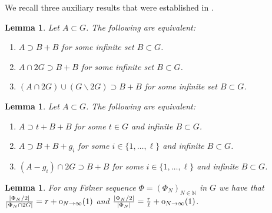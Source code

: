 \documentclass[reqno]{amsart}
\def\N{{\mathbb N}}
\newtheorem{lemma}[theorem]{Lemma}
\theoremstyle{definition}
\theoremstyle{remark}
\theoremstyle{remark}
\def\N{{\mathbb N}}
\newcommand{\Folner}{F\o{}lner}
\newcommand{\oh}{{\rm o}}
\begin{document}
We recall three auxiliary results that were established in \cite{charamaras_kousek_mountakis_radic2025BBingroups}. 

\begin{lemma} \label{lemma reductions no shift}
        Let $A \subset G$. The following are equivalent:
    \begin{enumerate}
        \item \label{lemma reductions no shift_1} $A\supset B+B$ for some 
        infinite set $B\subset G$.
        \item \label{lemma reductions no shift_2} $A \cap 2G \supset B+B$ for some infinite set $B\subset G$.
        \item \label{lemma reductions no shift_3} $(A \cap 2G) \cup(G \backslash 2G) \supset B+B$ for some infinite set $B\subset G$.
    \end{enumerate}
\end{lemma}

\begin{lemma} \label{lemma reductions with shift}
Let $A \subset G$. The following are equivalent:
\begin{enumerate}
    \item \label{lemma reductions with shift_1} $A\supset t+B+B$ for some $t \in G$ and infinite $B \subset G$.
    \item \label{lemma reductions with shift_2} $A \supset B+B + g_i$ for some $i \in \{1, \ldots, \ell\}$ and infinite 
    $B \subset G$.
    \item \label{lemma reductions with shift_3} $(A - g_i) \cap 2G  \supset B+B$ for some $i \in \{1, \ldots, \ell\}$ and infinite 
    $B \subset G$.
\end{enumerate}
\end{lemma}

\begin{lemma}\label{lemma aux folner 2}
For any \Folner{} sequence $\Phi=(\Phi_N)_{N\in \N}$ in $G$ we have that 
$\frac{|\Phi_N/2|}{|\Phi_N \cap 2G|}= r + \oh_{N\to \infty} (1) $ 
and $\frac{|\Phi_N/2|}{|\Phi_N|}= \frac{r}{\ell} + \oh_{N\to \infty} (1)$.    
\end{lemma}
\end{document}
